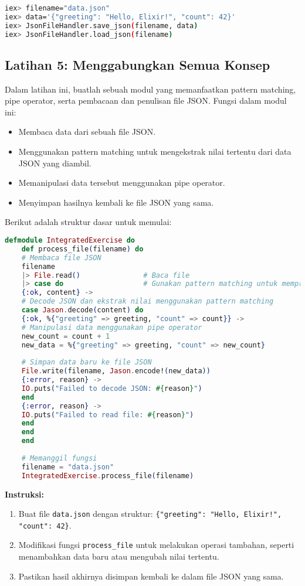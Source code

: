 \begin{lstlisting}[language=bash]
iex> filename="data.json"
iex> data='{"greeting": "Hello, Elixir!", "count": 42}'
iex> JsonFileHandler.save_json(filename, data)
iex> JsonFileHandler.load_json(filename)
\end{lstlisting}


\subsection{Latihan 5: Menggabungkan Semua Konsep}

Dalam latihan ini, buatlah sebuah modul yang memanfaatkan pattern matching, pipe operator, serta pembacaan dan penulisan file JSON. Fungsi dalam modul ini:
\begin{itemize}
	\item Membaca data dari sebuah file JSON.
	\item Menggunakan pattern matching untuk mengekstrak nilai tertentu dari data JSON yang diambil.
	\item Memanipulasi data tersebut menggunakan pipe operator.
	\item Menyimpan hasilnya kembali ke file JSON yang sama.
\end{itemize}

Berikut adalah struktur dasar untuk memulai:

\begin{lstlisting}[language=Elixir]
	defmodule IntegratedExercise do
	def process_file(filename) do
	# Membaca file JSON
	filename
	|> File.read()               # Baca file
	|> case do                   # Gunakan pattern matching untuk memproses konten
	{:ok, content} ->
	# Decode JSON dan ekstrak nilai menggunakan pattern matching
	case Jason.decode(content) do
	{:ok, %{"greeting" => greeting, "count" => count}} ->
	# Manipulasi data menggunakan pipe operator
	new_count = count + 1
	new_data = %{"greeting" => greeting, "count" => new_count}
	
	# Simpan data baru ke file JSON
	File.write(filename, Jason.encode!(new_data))
	{:error, reason} ->
	IO.puts("Failed to decode JSON: #{reason}")
	end
	{:error, reason} ->
	IO.puts("Failed to read file: #{reason}")
	end
	end
	end
	
	# Memanggil fungsi
	filename = "data.json"
	IntegratedExercise.process_file(filename)
\end{lstlisting}

\textbf{Instruksi:}
\begin{enumerate}
	\item Buat file \texttt{data.json} dengan struktur: \texttt{\{"greeting": "Hello, Elixir!", "count": 42\}}.
	\item Modifikasi fungsi \texttt{process\_file} untuk melakukan operasi tambahan, seperti menambahkan data baru atau mengubah nilai tertentu.
	\item Pastikan hasil akhirnya disimpan kembali ke dalam file JSON yang sama.
\end{enumerate}

